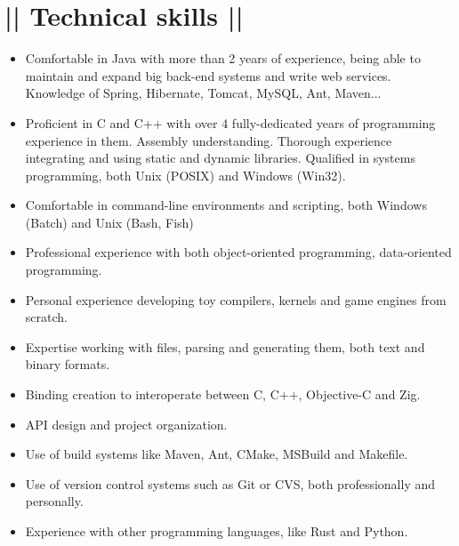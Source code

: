 \section*{|| Technical skills ||}
\begin{itemize}
	\item Comfortable in Java with more than 2 years of experience, being able to maintain and expand big back-end systems and write web services. Knowledge of Spring, Hibernate, Tomcat, MySQL, Ant, Maven...
	\item Proficient in C and C++ with over 4 fully-dedicated years of programming experience in them. Assembly understanding. Thorough experience integrating and using static and dynamic libraries. Qualified in systems programming, both Unix (POSIX) and Windows (Win32).
	\item Comfortable in command-line environments and scripting, both Windows (Batch) and Unix (Bash, Fish)
	\item Professional experience with both object-oriented programming, data-oriented programming.
	\item Personal experience developing toy compilers, kernels and game engines from scratch.
	\item Expertise working with files, parsing and generating them, both text and binary formats.
	\item Binding creation to interoperate between C, C++, Objective-C and Zig.
	\item API design and project organization.
	\item Use of build systems like Maven, Ant, CMake, MSBuild and Makefile.
	\item Use of version control systems such as Git or CVS, both professionally and personally.
	\item Experience with other programming languages, like Rust and Python.
\end{itemize}